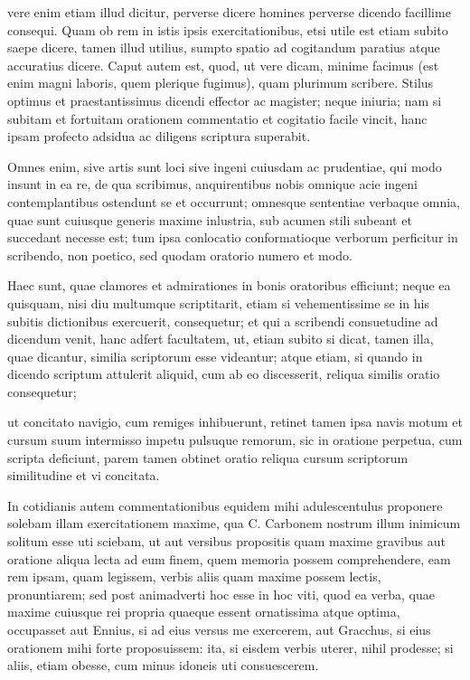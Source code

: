  vere enim etiam illud dicitur, perverse dicere homines perverse dicendo facillime consequi. Quam ob rem in istis ipsis exercitationibus, etsi utile est etiam subito saepe dicere, tamen illud utilius, sumpto spatio ad cogitandum paratius atque accuratius dicere. Caput autem est, quod, ut vere dicam, minime facimus (est enim magni laboris, quem plerique fugimus), quam plurimum scribere. Stilus optimus et praestantissimus dicendi effector ac magister; neque iniuria; nam si subitam et fortuitam orationem commentatio et cogitatio facile vincit, hanc ipsam profecto adsidua ac diligens scriptura superabit.

 Omnes enim, sive artis sunt loci sive ingeni cuiusdam ac prudentiae, qui modo insunt in ea re, de qua scribimus, anquirentibus nobis omnique acie ingeni contemplantibus ostendunt se et occurrunt; omnesque sententiae verbaque omnia, quae sunt cuiusque generis maxime inlustria, sub acumen stili subeant et succedant necesse est; tum ipsa conlocatio conformatioque verborum perficitur in scribendo, non poetico, sed quodam oratorio numero et modo.

 Haec sunt, quae clamores et admirationes in bonis oratoribus efficiunt; neque ea quisquam, nisi diu multumque scriptitarit, etiam si vehementissime se in his subitis dictionibus exercuerit, consequetur; et qui a scribendi consuetudine ad dicendum venit, hanc adfert facultatem, ut, etiam subito si dicat, tamen illa, quae dicantur, similia scriptorum esse videantur; atque etiam, si quando in dicendo scriptum attulerit aliquid, cum ab eo discesserit, reliqua similis oratio consequetur;

 ut concitato navigio, cum remiges inhibuerunt, retinet tamen ipsa navis motum et cursum suum intermisso impetu pulsuque remorum, sic in oratione perpetua, cum scripta deficiunt, parem tamen obtinet oratio reliqua cursum scriptorum similitudine et vi concitata.

 In cotidianis autem commentationibus equidem mihi adulescentulus proponere solebam illam exercitationem maxime, qua C. Carbonem nostrum illum inimicum solitum esse uti sciebam, ut aut versibus propositis quam maxime gravibus aut oratione aliqua lecta ad eum finem, quem memoria possem comprehendere, eam rem ipsam, quam legissem, verbis aliis quam maxime possem lectis, pronuntiarem; sed post animadverti hoc esse in hoc viti, quod ea verba, quae maxime cuiusque rei propria quaeque essent ornatissima atque optima, occupasset aut Ennius, si ad eius versus me exercerem, aut Gracchus, si eius orationem mihi forte proposuissem: ita, si eisdem verbis uterer, nihil prodesse; si aliis, etiam obesse, cum minus idoneis uti consuescerem.

